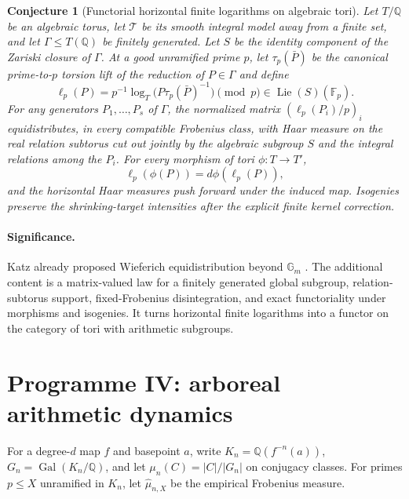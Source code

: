 \documentclass[11pt]{article}
\newtheorem{conjecture}{Conjecture}
\newcommand{\Gal}{\operatorname{Gal}}
\newcommand{\Fq}{\mathbb F}
\newcommand{\Q}{\mathbb Q}
\begin{document}
\begin{conjecture}[Functorial horizontal finite logarithms on algebraic tori]\label{c15}
Let $T/\Q$ be an algebraic torus, let $\mathcal T$ be its smooth integral model away from
a finite set, and let $\Gamma\le T(\Q)$ be finitely generated.  Let $S$ be the identity
component of the Zariski closure of $\Gamma$.  At a good unramified prime $p$, let
$\tau_p(\bar P)$ be the canonical prime-to-$p$ torsion lift of the reduction of
$P\in\Gamma$ and define
\[
 \ell_p(P)=p^{-1}\log_T\bigl(P\tau_p(\bar P)^{-1}\bigr)\pmod p
 \in\operatorname{Lie}(S)(\Fq_p).
\]
For any generators $P_1,\ldots,P_s$ of $\Gamma$, the normalized matrix
$(\ell_p(P_i)/p)_i$ equidistributes, in every compatible Frobenius class, with Haar
measure on the real relation subtorus cut out jointly by the algebraic subgroup $S$ and
the integral relations among the $P_i$.  For every morphism of tori $\phi:T\to T'$,
\[
 \ell_p(\phi(P))=d\phi(\ell_p(P)),
\]
and the horizontal Haar measures push forward under the induced map.  Isogenies preserve
the shrinking-target intensities after the explicit finite kernel correction.
\end{conjecture}

\paragraph{Significance.}
Katz already proposed Wieferich equidistribution beyond $\mathbb G_m$ \cite{Katz}.  The
additional content is a matrix-valued law for a finitely generated global subgroup,
relation-subtorus support, fixed-Frobenius disintegration, and exact functoriality under
morphisms and isogenies.  It turns horizontal finite logarithms into a functor on the
category of tori with arithmetic subgroups.

\section{Programme IV: arboreal arithmetic dynamics}

For a degree-$d$ map $f$ and basepoint $a$, write
$K_n=\Q(f^{-n}(a))$, $G_n=\Gal(K_n/\Q)$, and let
$\mu_n(C)=|C|/|G_n|$ on conjugacy classes.  For primes $p\le X$ unramified in $K_n$,
let $\widehat\mu_{n,X}$ be the empirical Frobenius measure.
\end{document}
